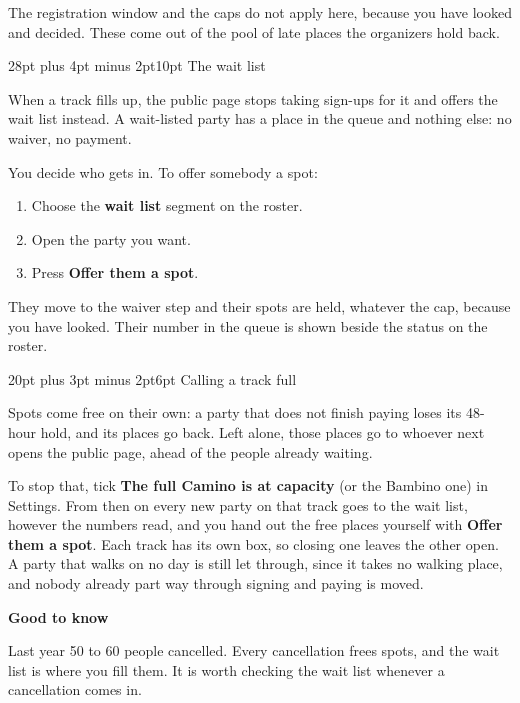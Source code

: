 \documentclass[12pt]{article}
\makeatletter
\renewcommand\section{\@startsection{section}{1}{0pt}%
  {28pt plus 4pt minus 2pt}{10pt}%
  {\normalfont\Large\bfseries\color{accent}}}
\renewcommand\subsection{\@startsection{subsection}{2}{0pt}%
  {20pt plus 3pt minus 2pt}{6pt}%
  {\normalfont\large\bfseries\color{ink}}}
\newcommand{\notecolour}{softbg}
\newenvironment{note}[2][softbg]
  {\renewcommand{\notecolour}{#1}%
   \par\medskip
   \setlength{\fboxsep}{11pt}%
   \begin{lrbox}{\notebox}%
   \begin{minipage}{\dimexpr\linewidth-2\fboxsep\relax}%
   \setlength{\parskip}{7pt}%
   \textbf{#2}\par}
  {\end{minipage}%
   \end{lrbox}%
   \noindent\expandafter\colorbox\expandafter{\notecolour}{\usebox{\notebox}}%
   \par\medskip}
\newcommand{\btn}[1]{\textbf{#1}}
\makeatother
\begin{document}
The registration window and the caps do not apply here, because you
have looked and decided. These come out of the pool of late places the
organizers hold back.

\section{The wait list}

When a track fills up, the public page stops taking sign-ups for it and
offers the wait list instead. A wait-listed party has a place in the
queue and nothing else: no waiver, no payment.

You decide who gets in. To offer somebody a spot:

\begin{enumerate}[leftmargin=*,itemsep=6pt]
\item Choose the \btn{wait list} segment on the roster.
\item Open the party you want.
\item Press \btn{Offer them a spot}.
\end{enumerate}

They move to the waiver step and their spots are held, whatever the
cap, because you have looked. Their number in the queue is shown beside
the status on the roster.

\subsection{Calling a track full}

Spots come free on their own: a party that does not finish paying loses
its 48-hour hold, and its places go back. Left alone, those places go to
whoever next opens the public page, ahead of the people already waiting.

To stop that, tick \btn{The full Camino is at capacity} (or the Bambino
one) in Settings. From then on every new party on that track goes to the
wait list, however the numbers read, and you hand out the free places
yourself with \btn{Offer them a spot}. Each track has its own box, so
closing one leaves the other open. A party that walks on no day is still
let through, since it takes no walking place, and nobody already part
way through signing and paying is moved.

\begin{note}{Good to know}
Last year 50 to 60 people cancelled. Every cancellation frees spots,
and the wait list is where you fill them. It is worth checking the wait
list whenever a cancellation comes in.
\end{note}
\end{document}
